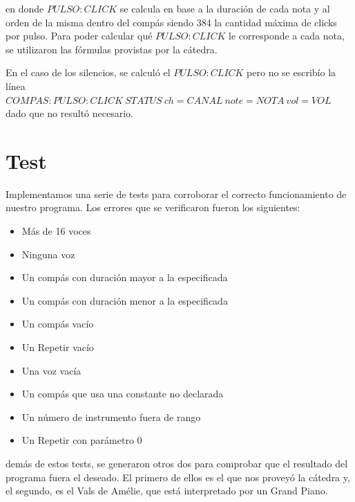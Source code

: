 \documentclass[a4paper, 10pt, twoside]{article}
\begin{document}
en donde $PULSO:CLICK$ se calcula en base a la duración de cada nota y al orden de la misma dentro del compás siendo 384 la cantidad máxima de clicks por pulso. Para poder calcular qué $PULSO:CLICK$ le corresponde a cada nota, se utilizaron las fórmulas provistas por la cátedra.

En el caso de los silencios, se calculó el $PULSO:CLICK$ pero no se escribío la línea $COMPAS:PULSO:CLICK\ STATUS\ ch=CANAL\ note=NOTA\ vol=VOL$ dado que no resultó necesario.

\newpage


\section{Test}
Implementamos una serie de tests para corroborar el correcto funcionamiento de nuestro programa. Los errores que se verificaron fueron los siguientes:

\begin{itemize}
\item Más de 16 voces
\item Ninguna voz
\item Un compás con duración mayor a la especificada
\item Un compás con duración menor a la especificada
\item Un compás vacío 
\item Un Repetir vacío
\item Una voz vacía 
\item Un compás que usa una constante no declarada
\item Un número de instrumento fuera de rango
\item Un Repetir con parámetro 0

\end{itemize}
demás de estos tests, se generaron otros dos para comprobar que el resultado del programa fuera el deseado. El primero de ellos es el que nos proveyó la cátedra y, el segundo, es el Vals de Amélie, que está interpretado por un Grand Piano.


\end{document}
